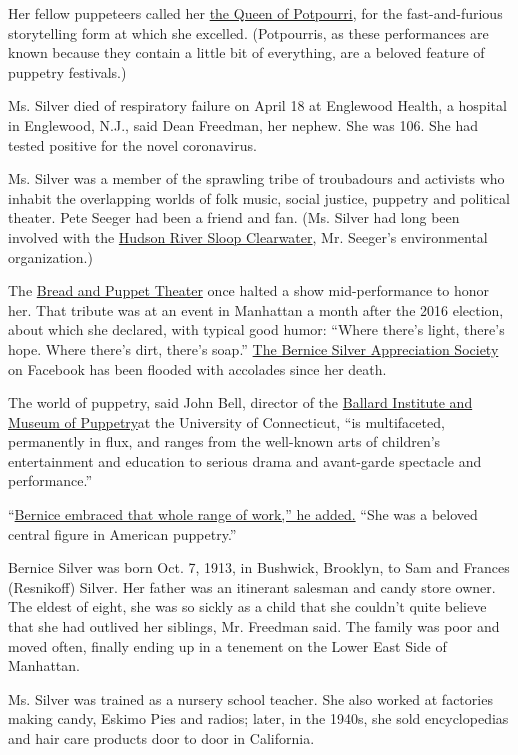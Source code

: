 Her fellow puppeteers called her
\href{https://www.youtube.com/watch?v=muhRXY_1IPI}{the Queen of
Potpourri}, for the fast-and-furious storytelling form at which she
excelled. (Potpourris, as these performances are known because they
contain a little bit of everything, are a beloved feature of puppetry
festivals.)

Ms. Silver died of respiratory failure on April 18 at Englewood Health,
a hospital in Englewood, N.J., said Dean Freedman, her nephew. She was
106. She had tested positive for the novel coronavirus.

Ms. Silver was a member of the sprawling tribe of troubadours and
activists who inhabit the overlapping worlds of folk music, social
justice, puppetry and political theater. Pete Seeger had been a friend
and fan. (Ms. Silver had long been involved with the
\href{https://www.clearwater.org/}{Hudson River Sloop Clearwater}, Mr.
Seeger's environmental organization.)

The \href{https://breadandpuppet.org}{Bread and Puppet Theater} once
halted a show mid-performance to honor her. That tribute was at an event
in Manhattan a month after the 2016 election, about which she declared,
with typical good humor: ``Where there's light, there's hope. Where
there's dirt, there's soap.''
\href{https://www.facebook.com/groups/178715305925/}{The Bernice Silver
Appreciation Society} on Facebook has been flooded with accolades since
her death.

The world of puppetry, said John Bell, director of the
\href{https://bimp.uconn.edu}{Ballard Institute and Museum of
Puppetry}at the University of Connecticut, ``is multifaceted,
permanently in flux, and ranges from the well-known arts of children's
entertainment and education to serious drama and avant-garde spectacle
and performance.''

``\href{http://puppetvision.blog/2014/10/happy-101st-birthday-bernice-silver/}{Bernice
embraced that whole range of work,'' he added.} ``She was a beloved
central figure in American puppetry.''

Bernice Silver was born Oct. 7, 1913, in Bushwick, Brooklyn, to Sam and
Frances (Resnikoff) Silver. Her father was an itinerant salesman and
candy store owner. The eldest of eight, she was so sickly as a child
that she couldn't quite believe that she had outlived her siblings, Mr.
Freedman said. The family was poor and moved often, finally ending up in
a tenement on the Lower East Side of Manhattan.

Ms. Silver was trained as a nursery school teacher. She also worked at
factories making candy, Eskimo Pies and radios; later, in the 1940s, she
sold encyclopedias and hair care products door to door in California.

